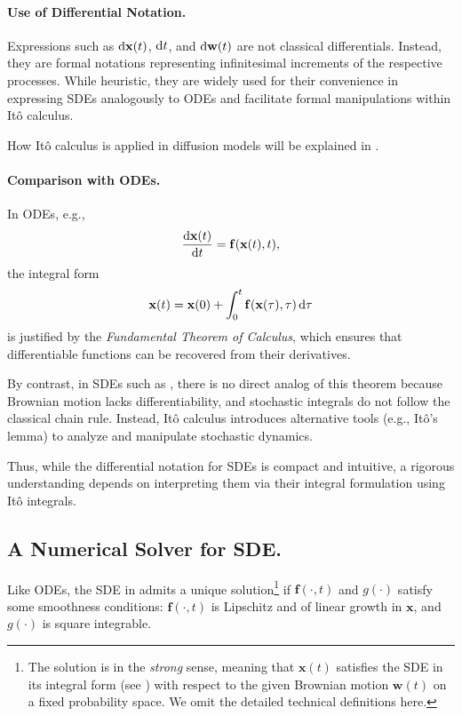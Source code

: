 \paragraph{Use of Differential Notation.}
Expressions such as $ \mathop{}\!\mathrm{d} {\mathbf{x}}(t) $, $ \mathop{}\!\mathrm{d} t $, and $ \mathop{}\!\mathrm{d} {\mathbf{w}}(t) $ are not classical differentials. Instead, they are formal notations representing infinitesimal increments of the respective processes. While heuristic, they are widely used for their convenience in expressing SDEs analogously to ODEs and facilitate formal manipulations within Itô calculus.

How Itô calculus is applied in diffusion models will be explained in .


\paragraph{Comparison with ODEs.}
In ODEs, e.g.,
\[
\frac{\mathop{}\!\mathrm{d} {\mathbf{x}}(t)}{\mathop{}\!\mathrm{d} t} = {\mathbf{f}}({\mathbf{x}}(t), t),
\]
the integral form
\[
{\mathbf{x}}(t) = {\mathbf{x}}(0) + \int_0^t {\mathbf{f}}({\mathbf{x}}(\tau), \tau) \mathop{}\!\mathrm{d} \tau
\]
is justified by the \emph{Fundamental Theorem of Calculus}, which ensures that differentiable functions can be recovered from their derivatives.

By contrast, in SDEs such as , there is no direct analog of this theorem because Brownian motion lacks differentiability, and stochastic integrals do not follow the classical chain rule. Instead, Itô calculus introduces alternative tools (e.g., Itô's lemma) to analyze and manipulate stochastic dynamics.

Thus, while the differential notation for SDEs is compact and intuitive, a rigorous understanding depends on interpreting them via their integral formulation using Itô integrals.



\subsection{A Numerical Solver for SDE.} Like ODEs, the SDE in  admits a unique solution\footnote{The solution is in the \emph{strong} sense, meaning that $\mathbf{x}(t)$ satisfies the SDE in its integral form (see ) with respect to the given Brownian motion $\mathbf{w}(t)$ on a fixed probability space. We omit the detailed technical definitions here.} if $\mathbf{f}(\cdot, t)$ and $g(\cdot)$ satisfy some smoothness conditions: $\mathbf{f}(\cdot, t)$ is Lipschitz and of linear growth in $\mathbf{x}$, and $g(\cdot)$ is square integrable.


